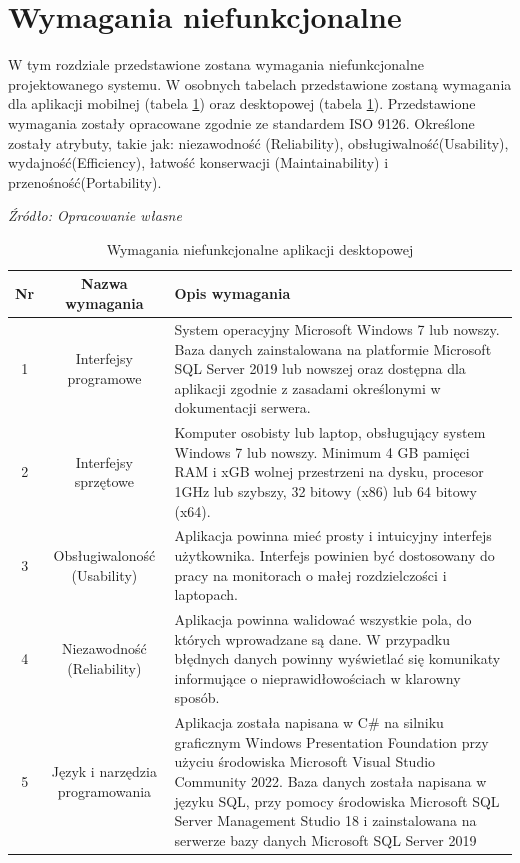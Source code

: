 \documentclass[12pt,oneside]{report}
\begin{document}
\section{Wymagania niefunkcjonalne}
W tym rozdziale przedstawione zostana wymagania niefunkcjonalne projektowanego systemu. W osobnych tabelach przedstawione zostaną wymagania dla aplikacji mobilnej (tabela \ref{}) oraz desktopowej (tabela \ref{WymaganiaNFdesktop}). 
Przedstawione wymagania zostały opracowane zgodnie ze standardem ISO 9126. Określone zostały atrybuty, takie jak: niezawodność (Reliability), obsługiwalność(Usability), wydajność(Efficiency), łatwość konserwacji (Maintainability) i przenośność(Portability).
	\begin{table}[H]
	\caption{Wymagania niefunkcjonalne aplikacji desktopowej }
	\textit{Źródło: Opracowanie własne}
	\label{WymaganiaNFdesktop}
	\centering
	\begin{tabular}{|c|c|p{8cm}|}
		\hline
		Nr & Nazwa wymagania & Opis wymagania\\
		\hline
		1& Interfejsy programowe& System operacyjny Microsoft Windows 7 lub nowszy. Baza danych zainstalowana na platformie Microsoft SQL Server 2019 lub nowszej oraz dostępna dla aplikacji zgodnie z zasadami określonymi w dokumentacji serwera.\\		
		\hline
		2& Interfejsy sprzętowe& Komputer osobisty lub laptop, obsługujący system Windows 7 lub nowszy. Minimum 4 GB pamięci RAM i xGB wolnej przestrzeni na dysku, procesor 1GHz lub szybszy, 32 bitowy (x86) lub 64 bitowy (x64).\\	
		\hline	
		3& Obsługiwaloność (Usability)& Aplikacja powinna mieć prosty i intuicyjny interfejs użytkownika. Interfejs powinien być dostosowany do pracy na monitorach o małej rozdzielczości i laptopach.\\		
		\hline
		4& Niezawodność (Reliability)& Aplikacja powinna walidować wszystkie pola, do których wprowadzane są dane. W przypadku błędnych danych powinny wyświetlać się komunikaty informujące o nieprawidłowościach w klarowny sposób.\\	
		\hline
		5& Język i narzędzia programowania& Aplikacja została napisana w C\# na silniku graficznym Windows Presentation Foundation przy użyciu środowiska  Microsoft Visual Studio Community 2022.
		Baza danych została napisana w języku SQL, przy pomocy środowiska Microsoft SQL Server Management Studio 18 i zainstalowana na serwerze bazy danych Microsoft SQL Server 2019\\	
		\hline
	\end{tabular}
\end{table}
\end{document}
